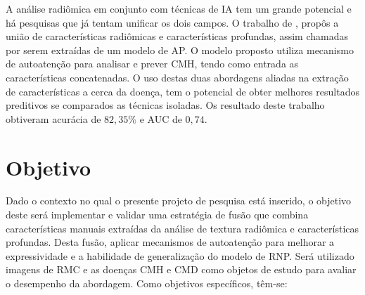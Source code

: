 A análise radiômica em conjunto com técnicas de \gls{IA} tem um grande potencial e há pesquisas que já tentam unificar os dois campos. O trabalho de , propôs a união de características radiômicas e características profundas, assim chamadas por serem extraídas de um modelo de \gls{AP}. O modelo proposto utiliza mecanismo de autoatenção para analisar e prever \gls{CMH}, tendo como entrada as características concatenadas. O uso destas duas abordagens aliadas na extração de características a cerca da doença, tem o potencial de obter melhores resultados preditivos se comparados as técnicas isoladas. Os resultado deste trabalho obtiveram acurácia de $82,35\%$ e AUC de $0,74$.

\newpage

\section{Objetivo}
\label{sec:cap1_objetivo}

Dado o contexto no qual o presente projeto de pesquisa está inserido, o objetivo deste será implementar e validar uma estratégia de fusão que combina características manuais extraídas da análise de textura radiômica e características profundas. Desta fusão, aplicar mecanismos de autoatenção para melhorar a expressividade e a habilidade de generalização do modelo de \gls{RNP}. Será utilizado imagens de \gls{RMC} e as doenças \gls{CMH} e \gls{CMD} como objetos de estudo para avaliar o desempenho da abordagem. Como objetivos específicos, têm-se:

